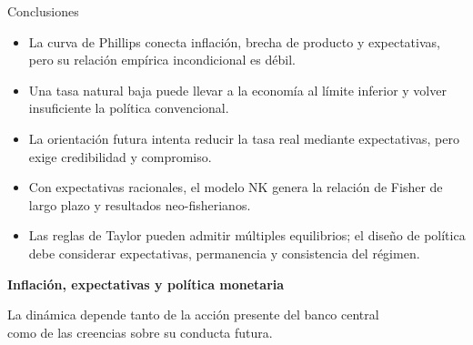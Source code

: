 \documentclass[aspectratio=169,11pt]{beamer}
\begin{document}
\begin{frame}{Conclusiones}
  \begin{itemize}
    \setlength{\itemsep}{0.58em}
    \item La curva de Phillips conecta inflación, brecha de producto y expectativas, pero su relación empírica incondicional es débil.
    \item Una tasa natural baja puede llevar a la economía al límite inferior y volver insuficiente la política convencional.
    \item La orientación futura intenta reducir la tasa real mediante expectativas, pero exige credibilidad y compromiso.
    \item Con expectativas racionales, el modelo NK genera la relación de Fisher de largo plazo y resultados neo-fisherianos.
    \item Las reglas de Taylor pueden admitir múltiples equilibrios; el diseño de política debe considerar expectativas, permanencia y consistencia del régimen.
  \end{itemize}
\end{frame}

\begin{frame}[plain]
  \centering
  \vfill
  {\LARGE\color{CIDEBlue}\bfseries Inflación, expectativas y política monetaria}
  \vspace{0.55cm}

  {\large La dinámica depende tanto de la acción presente del banco central\\
  como de las creencias sobre su conducta futura.}
  \vfill
\end{frame}
\end{document}
